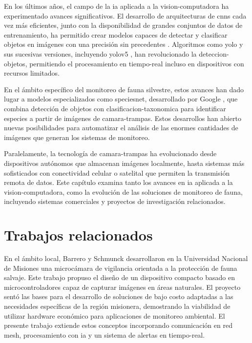 \documentclass[a4paper, 12pt]{report}
\begin{document}
En los últimos años, el campo de la \gls{ia} aplicada a la \gls{vision-computadora} ha experimentado avances significativos. El desarrollo de
arquitecturas de \glspl{cnn} cada vez más eficientes, junto con la
disponibilidad de grandes conjuntos de datos de entrenamiento, ha permitido
crear modelos capaces de detectar y clasificar objetos en imágenes con
una precisión sin precedentes \cite{schneider2018deep}. Algoritmos como
\gls{yolo} \cite{redmon2016yolo} y sus sucesivas versiones, incluyendo
\gls{yolov5} \cite{jocher2020yolov5}, han revolucionado la \gls{deteccion-objetos},
permitiendo el procesamiento en \gls{tiempo-real} incluso en dispositivos
con recursos limitados.

En el ámbito específico del monitoreo de fauna silvestre, estos avances
han dado lugar a modelos especializados como \gls{speciesnet}, desarrollado
por Google \cite{gadot2024crop}, que combina detección de objetos con
\gls{clasificacion-taxonomica} para identificar especies a partir de imágenes
de \glspl{camara-trampa}. Estos desarrollos han abierto nuevas posibilidades
para automatizar el análisis de las enormes cantidades de imágenes que
generan los sistemas de monitoreo.

Paralelamente, la tecnología de \glspl{camara-trampa} ha evolucionado desde
dispositivos autónomos que almacenan imágenes localmente, hasta sistemas
más sofisticados con conectividad celular o satelital que permiten la
transmisión remota de datos. Este capítulo examina tanto los avances en
\gls{ia} aplicada a la \gls{vision-computadora}, como la evolución de las
soluciones de monitoreo de fauna, incluyendo sistemas comerciales y
proyectos de investigación relacionados.

\section{Trabajos relacionados}

En el ámbito local, Barrero y Schmunck \cite{barrero2023microcamara} desarrollaron
en la Universidad Nacional de Misiones una microcámara de vigilancia orientada
a la protección de fauna salvaje. Este trabajo propuso el diseño de un
dispositivo compacto basado en microcontroladores capaz de capturar imágenes
en áreas naturales. El proyecto sentó las bases para el desarrollo de
soluciones de bajo costo adaptadas a las necesidades específicas de la
región misionera, demostrando la viabilidad de utilizar hardware económico
para aplicaciones de monitoreo ambiental. El presente trabajo extiende
estos conceptos incorporando comunicación en red \gls{mesh}, procesamiento
con \gls{ia} y un sistema de alertas en \gls{tiempo-real}.
\end{document}
